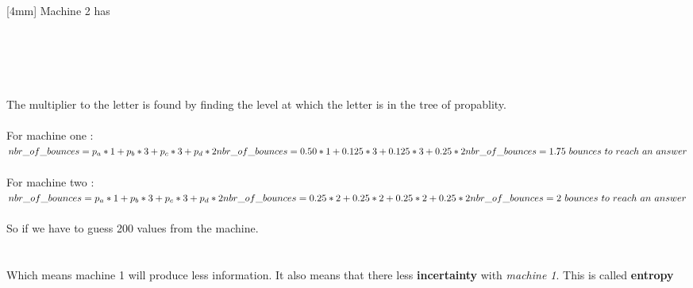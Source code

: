 \documentclass{article}
\begin{document}
    [4mm]
    Machine 2 has \\
    \\
    \\
    \\
    \\
    \\
    [4mm]
    The multiplier to the letter is found by finding the level at which the letter
    is in the tree of propablity.
    \\
    [2mm]
    \\
    For machine one :\\
    [1mm]
    \begin{math}
      nbr\_of\_bounces = p_a * 1 + p_b * 3 + p_c * 3 + p_d * 2\\
      nbr\_of\_bounces = 0.50 * 1 + 0.125 * 3 + 0.125 * 3 + 0.25 * 2\\
      nbr\_of\_bounces = 1.75\ bounces\ to\ reach\ an\ answer
    \end{math}
    \\
    [2mm]
    \\
    For machine two :\\
    [1mm]
    \begin{math}
      nbr\_of\_bounces = p_a * 1 + p_b * 3 + p_c * 3 + p_d * 2\\
      nbr\_of\_bounces = 0.25 * 2 + 0.25 * 2 + 0.25 * 2 + 0.25 * 2\\
      nbr\_of\_bounces = 2\ bounces\ to\ reach\ an\ answer
    \end{math}
    \\
    [4mm]
    \\
    So if we have to guess 200 values from the machine.\\
    [2mm]
    \\
    [1mm]
    \\
    [2mm]
    Which means machine 1 will produce less information. It also means
    that there less \textbf{incertainty} with \textit{machine 1}. This is called \textbf{entropy}
\end{document}
